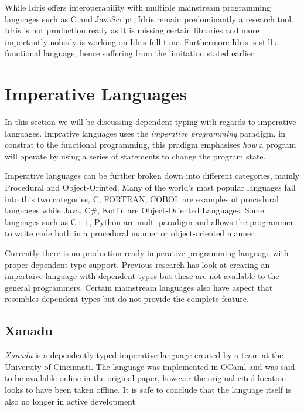 \documentclass[a4paper,12pt]{report}
\begin{document}
\par
While Idris offers interoperability with multiple mainstream programming 
languages such as C and JavaScript, Idris remain predominantly a research tool. 
Idris is not production ready \cite{gpIdris} as it is missing certain libraries 
and more importantly nobody is working on Idris full time. Furthermore Idris is 
still a functional language, hence suffering from the limitation stated earlier. 

\section{Imperative Languages}

In this section we will be discussing dependent typing with regards to imperative 
languages. Imprative languages uses the \textit{imperative programming} 
\cite{imperativeOverview} paradigm, in constrat to the functional 
programming, this pradigm emphasises \textit{how} a program will operate 
by using a series of statements to change the program state.

\par

Imperative languages can be further broken down into different categories, 
mainly Procedural and Object-Orinted. Many of the world's most popular languages 
fall into this two categories, C, FORTRAN, COBOL are examples of procedural 
languages while Java, C#, Kotlin are Object-Oriented Languages. Some languages such 
as C++, Python are multi-paradigm and allows the programmer to write code both 
in a procedural manner or object-oriented manner. 

\par

Currently there is no production ready imperative programming language with 
proper dependent type support. Previous research has look at creating an 
impertaive language with dependent types but these are not available to the 
general programmers. Certain mainstream languages also have aspect that 
resembles dependent types but do not provide the complete feature.

\subsection{Xanadu}
\textit{Xanadu} \cite{xanadu} is a dependently typed imperative language created by a team at 
the University of Cincinnati. The language was implemented in OCaml and was 
said to be available online in the original paper, however the original cited 
location looks to have been taken offline. It is safe to conclude that 
the language itself is also no longer in active development 
\end{document}
